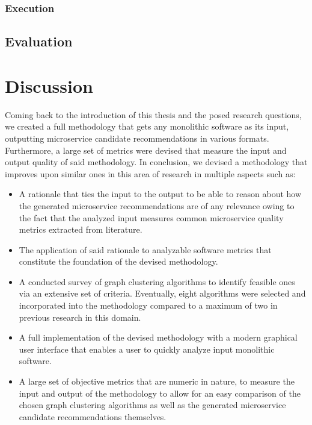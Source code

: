 \documentclass[12pt,a4paper]{report}
\begin{document}
\subsection{Execution}





\section{Evaluation} \label{sect:evaluation}




\chapter{Discussion} \label{chap:discussion}

Coming back to the introduction of this thesis and the posed research questions,
we created a full methodology that gets any monolithic software as its input,
outputting microservice candidate recommendations in various formats.
Furthermore, a large set of metrics were devised that measure the input and
output quality of said methodology.
In conclusion, we devised a methodology that improves upon similar ones in
this area of research in multiple aspects such as:

\begin{itemize}
    \item A rationale that ties the input to the output to be able to reason
    about how the generated microservice recommendations are of any relevance
    owing to the fact that the analyzed input measures common microservice
    quality metrics extracted from literature.
    \item The application of said rationale to analyzable software metrics
    that constitute the foundation of the devised methodology.
    \item A conducted survey of graph clustering algorithms to identify feasible
    ones via an extensive set of criteria. Eventually, eight algorithms were
    selected and incorporated into the methodology compared to a maximum
    of two in previous research in this domain.
    \item A full implementation of the devised methodology with a modern
    graphical user interface that enables a user to quickly analyze input
    monolithic software.
    \item A large set of objective metrics that are numeric in nature,
    to measure the input and output of the methodology to allow for an
    easy comparison of the chosen graph clustering algorithms as well as
    the generated microservice candidate recommendations themselves.
\end{itemize}
\end{document}
